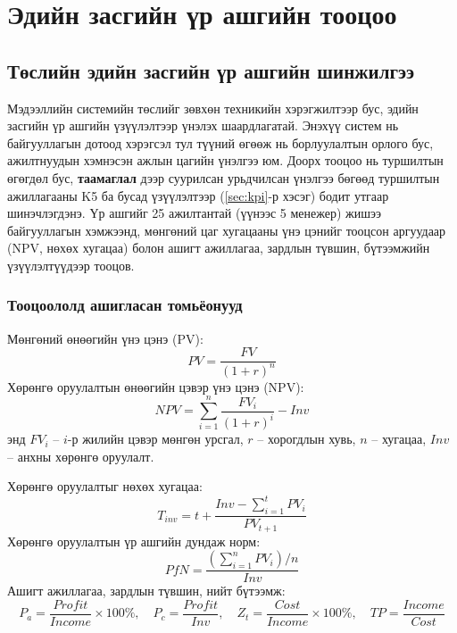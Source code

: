 
\chapter{Эдийн засгийн үр ашгийн тооцоо}
\label{Chapter4}

\section{Төслийн эдийн засгийн үр ашгийн шинжилгээ}
Мэдээллийн системийн төслийг зөвхөн техникийн хэрэгжилтээр бус, эдийн засгийн үр ашгийн үзүүлэлтээр үнэлэх шаардлагатай. Энэхүү систем нь байгууллагын дотоод хэрэгсэл тул түүний өгөөж нь борлуулалтын орлого бус, ажилтнуудын хэмнэсэн ажлын цагийн үнэлгээ юм. Доорх тооцоо нь туршилтын өгөгдөл бус, \textbf{таамаглал} дээр суурилсан урьдчилсан үнэлгээ бөгөөд туршилтын ажиллагааны K5 ба бусад үзүүлэлтээр (\ref{sec:kpi}-р хэсэг) бодит утгаар шинэчлэгдэнэ. Үр ашгийг 25 ажилтантай (үүнээс 5 менежер) жишээ байгууллагын хэмжээнд, мөнгөний цаг хугацааны үнэ цэнийг тооцсон аргуудаар (NPV, нөхөх хугацаа) болон ашигт ажиллагаа, зардлын түвшин, бүтээмжийн үзүүлэлтүүдээр тооцов.

\subsection{Тооцоололд ашигласан томьёонууд}
Мөнгөний өнөөгийн үнэ цэнэ (PV):
\begin{equation}
PV = \frac{FV}{(1+r)^n}
\end{equation}
Хөрөнгө оруулалтын өнөөгийн цэвэр үнэ цэнэ (NPV):
\begin{equation}
NPV = \sum_{i=1}^{n} \frac{FV_i}{(1+r)^i} - Inv
\end{equation}
энд $FV_i$ -- $i$-р жилийн цэвэр мөнгөн урсгал, $r$ -- хорогдлын хувь, $n$ -- хугацаа, $Inv$ -- анхны хөрөнгө оруулалт.

Хөрөнгө оруулалтыг нөхөх хугацаа:
\begin{equation}
T_{inv} = t + \frac{Inv - \sum_{i=1}^{t} PV_i}{PV_{t+1}}
\end{equation}
Хөрөнгө оруулалтын үр ашгийн дундаж норм:
\begin{equation}
PfN = \frac{\left(\sum_{i=1}^{n} PV_i\right)/n}{Inv}
\end{equation}
Ашигт ажиллагаа, зардлын түвшин, нийт бүтээмж:
\begin{equation}
P_a = \frac{Profit}{Income}\times 100\%, \quad
P_c = \frac{Profit}{Inv}, \quad
Z_t = \frac{Cost}{Income}\times 100\%, \quad
TP = \frac{Income}{Cost}
\end{equation}

